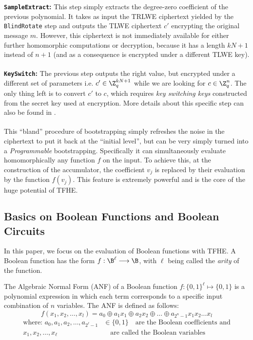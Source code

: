 \textbf{\texttt{SampleExtract}: } This step simply extracts the degree-zero coefficient of the previous polynomial. It takes as input the TRLWE ciphertext yielded by the \texttt{BlindRotate} step and outputs the TLWE ciphertext $c'$ encrypting the original message $m$. However, this ciphertext is not immediately available for either further homomorphic computations or decryption, because it has a length $kN + 1$ instead of $n + 1$ (and as a consequence is encrypted under a different TLWE key).
\\\\

\textbf{\texttt{KeySwitch}: }  The previous step outputs the right value, but encrypted under a different set of parameters i.e. $c' \in \Z_q^{kN+1}$ while we are looking for $c \in \Z_q^{n}$. The only thing left is to convert $c'$ to $c$, which requires \emph{key switching keys} constructed from the secret key \sk used at encryption. More details about this specific step can also be found in \cite{cryptoeprint:2018/421}.
\\\\

This ``bland'' procedure of bootstrapping simply refreshes the noise in the ciphertext to put it back at the ``initial level'', but can be very simply turned into a \emph{Programmable} bootstrapping. Specifically it can simultaneously evaluate homomorphically any function $f$ on the input. To achieve this, at the construction of the accumulator, the coefficient $v_j$ is replaced by their evaluation by the function $f(v_j)$. This feature is extremely powerful and is the core of the huge potential of TFHE.



\subsection{Basics on Boolean Functions and Boolean Circuits}
\label{sec:preliminaries_boolean}

In this paper, we focus on the evaluation of Boolean functions with TFHE. A Boolean function has the form $f: \B^\ell \longrightarrow \B$, with $\ell$ being called the \emph{arity} of the function. 

\begin{definition}
    
The Algebraic Normal Form (ANF) of a Boolean function $f: \{0,1\}^\ell \mapsto \{0,1\}$ is a polynomial expression in which each term corresponds to a specific input combination of $n$ variables. The ANF is defined as follows: \[f(x_1, x_2, \ldots, x_l) = a_0 \oplus a_1x_1 \oplus a_2x_2 \oplus \ldots \oplus a_{2^n-1}x_1x_2\ldots x_l\] \begin{align*}
\text{where: }a_0, a_1, a_2, \ldots, a_{2^\ell-1} & \in \{0,1\} \quad \text{are the Boolean coefficients and} \\
x_1, x_2, \ldots, x_\ell & \quad \text{are called the Boolean variables}
\end{align*}
\end{definition}

